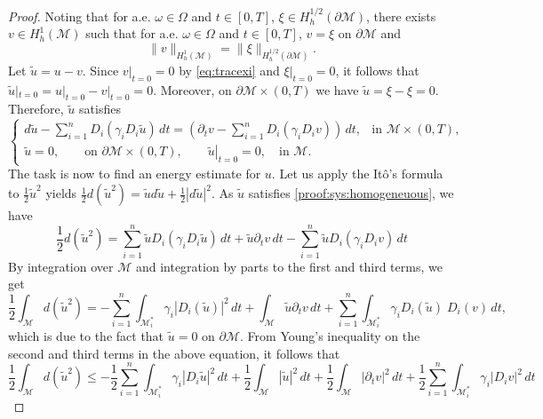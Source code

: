 \documentclass[10pt,a4paper]{amsart}
\begin{document}
\begin{proof}
Noting that for a.e. $\omega \in \Omega$ and $t \in [0,T]$, $\xi \in H_h^{1/2}(\partial \mathcal{M})$, there exists $v \in H_h^1(\mathcal{M})$ such that for a.e. $\omega \in \Omega$ and $t \in [0,T]$, $v = \xi$ on $\partial \mathcal{M}$ and
\begin{equation}\label{eq:tracexi}
\|v\|_{H_h^1(\mathcal{M})} =  \|\xi\|_{H_h^{1/2}(\partial \mathcal{M})}.
\end{equation}
Let $\tilde{u} = u - v$. Since $v|_{t=0}=0$ by \eqref{eq:tracexi} and $\xi|_{t=0}=0$, it follows that $\tilde{u}|_{t=0} = u|_{t=0} - v|_{t=0} = 0$. Moreover, on $\partial\mathcal{M}\times(0,T)$ we have $\tilde{u} = \xi - \xi = 0$. Therefore, $\tilde{u}$ satisfies
\begin{equation}\label{proof:sys:homogeneuous}
    \begin{cases}
    d\tilde{u} - \sum_{i=1}^{n} D_i(\gamma_i D_i \tilde{u}) \, dt = \left(\partial_t v - \sum_{i=1}^{n} D_i(\gamma_i D_i v)\right) \, dt, & \text{in } \mathcal{M} \times (0,T), \\
    \tilde{u} = 0, \quad\quad\text{on } \partial \mathcal{M} \times (0,T),\quad\quad
    \left.\tilde{u}\right|_{t=0} = 0,\quad \text{in } \mathcal{M}.
    \end{cases}
\end{equation}
The task is now to find an energy estimate for $u$. Let us apply the It\^{o}'s formula to $\displaystyle \frac{1}{2}\tilde{u}^2$ yields $\displaystyle \frac{1}{2}d(\tilde{u}^2)=\tilde{u}d\tilde{u}+\frac{1}{2}|d\tilde{u}|^2$. As $\tilde{u}$ satisfies \eqref{proof:sys:homogeneuous}, we have 
\[
\frac{1}{2}d(\tilde{u}^2)=\sum_{i=1}^{n}\tilde{u}D_i(\gamma_iD_i\tilde{u})\,dt+\tilde{u}\partial_{t}v\,dt-\sum_{i=1}^{n}\tilde{u}D_i(\gamma_iD_iv)\,dt
\]
By integration over $\mathcal{M}$ and integration by parts to the first and third terms, we get
\[
\frac{1}{2}\int_{\mathcal{M}}d(\tilde{u}^{2})=-\sum_{i=1}^{n}\int_{\mathcal{M}_i^{\ast}}\gamma_i|D_i(\tilde{u})|^2\,dt+\int_{\mathcal{M}}\tilde{u}\partial_{t}v\,dt+\sum_{i=1}^{n}\int_{\mathcal{M}_{i}^{*}}\gamma_iD_i(\tilde{u})\;D_i(v)\,dt,
\]
which is due to the fact that $\tilde{u}=0$ on $\partial\mathcal{M}$. From Young's inequality on the second and third terms in the above equation, it follows that
\[
\frac{1}{2}\int_{\mathcal{M}}d(\tilde{u}^2)\leq-\frac{1}{2}\sum_{i=1}^{n}\int_{\mathcal{M}_i^{*}}\gamma_i|D_i\tilde{u}|^2\,dt+\frac{1}{2}\int_{\mathcal{M}}|\tilde{u}|^2\,dt+\frac{1}{2}\int_{\mathcal{M}}|\partial_{t}v|^2\,dt+\frac{1}{2}\sum_{i=1}^{n}\int_{\mathcal{M}_i^{*}}\gamma_i|D_iv|^2\,dt
\]
\end{proof}
\end{document}
